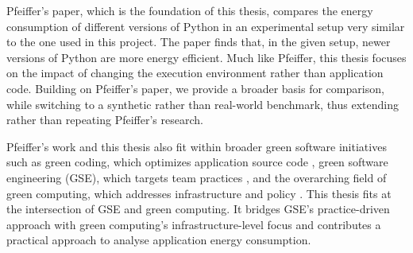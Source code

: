 Pfeiffer's paper\cite{pfeiffer2024energy}, which is the foundation of this thesis, compares the energy consumption of different versions of Python in an experimental setup very similar to the one used in this project. The paper finds that, in the given setup, newer versions of Python are more energy efficient. Much like Pfeiffer, this thesis focuses on the impact of changing the execution environment rather than application code. Building on Pfeiffer's paper, we provide a broader basis for comparison, while switching to a synthetic rather than real-world benchmark, thus extending rather than repeating Pfeiffer's research.

Pfeiffer’s work and this thesis also fit within broader green software initiatives such as green coding, which optimizes application source code \cite{radersma2022green,lamprakos_energy,holm2020gpu,reya2023greenpy}, green software engineering (GSE), which targets team practices \cite{lorincz2019greener,freed2023investigation,roque2025unveiling}, and the overarching field of green computing, which addresses infrastructure and policy \cite{paul2023comprehensive,ahmad2023green,tiwari2021review}. This thesis fits at the intersection of GSE and green computing. It bridges GSE’s practice-driven approach with green computing's infrastructure-level focus and contributes a practical approach to analyse application energy consumption.
